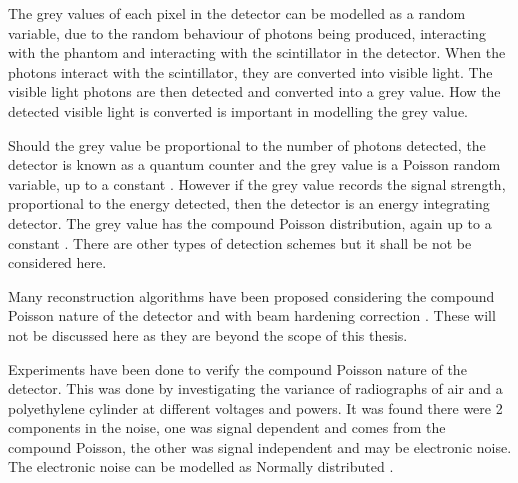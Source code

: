 \documentclass[12pt, a4paper]{memoir}
\begin{document}
The grey values of each pixel in the detector can be modelled as a random variable, due to the random behaviour of photons being produced, interacting with the phantom and interacting with the scintillator in the detector. When the photons interact with the scintillator, they are converted into visible light. The visible light photons are then detected and converted into a grey value. How the detected visible light is converted is important in modelling the grey value.

Should the grey value be proportional to the number of photons detected, the detector is known as a quantum counter and the grey value is a Poisson random variable, up to a constant \citep{whiting2006properties}. However if the grey value records the signal strength, proportional to the energy detected, then the detector is an energy integrating detector. The grey value has the compound Poisson distribution, again up to a constant \citep{whiting2006properties}. There are other types of detection schemes \citep{whiting2006properties} but it shall be not be considered here.

Many reconstruction algorithms have been proposed considering the compound Poisson nature of the detector \citep{elbakri2002statistical} \citep{elbakri2003statistical} \citep{lasio2007statistical} \citep{xie2008x} and with beam hardening correction \citep{elbakri2003efficient}. These will not be discussed here as they are beyond the scope of this thesis.

Experiments have been done to verify the compound Poisson nature of the detector. This was done by investigating the variance of radiographs of air \citep{hsieh2015compound} and a polyethylene cylinder \citep{yang2009evaluation} \citep{yang2010noise} at different voltages and powers. It was found there were 2 components in the noise, one was signal dependent and comes from the compound Poisson, the other was signal independent and may be electronic noise. The electronic noise can be modelled as Normally distributed \citep{xu2009electronic}.
\end{document}
